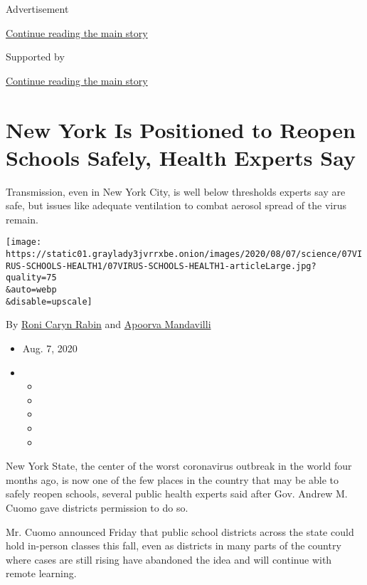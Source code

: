 Advertisement

\protect\hyperlink{after-top}{Continue reading the main story}

Supported by

\protect\hyperlink{after-sponsor}{Continue reading the main story}

\hypertarget{new-york-is-positioned-to-reopen-schools-safely-health-experts-say}{%
\section{New York Is Positioned to Reopen Schools Safely, Health Experts
Say}\label{new-york-is-positioned-to-reopen-schools-safely-health-experts-say}}

Transmission, even in New York City, is well below thresholds experts
say are safe, but issues like adequate ventilation to combat aerosol
spread of the virus remain.

\texttt{[image: https://static01.graylady3jvrrxbe.onion/images/2020/08/07/science/07VIRUS-SCHOOLS-HEALTH1/07VIRUS-SCHOOLS-HEALTH1-articleLarge.jpg?quality=75\\\&auto=webp\\\&disable=upscale]}

By \href{https://www.nytimes3xbfgragh.onion/by/roni-caryn-rabin}{Roni
Caryn Rabin} and
\href{https://www.nytimes3xbfgragh.onion/by/apoorva-mandavilli}{Apoorva
Mandavilli}

\begin{itemize}
\item
  Aug. 7, 2020
\item
  \begin{itemize}
  \item
  \item
  \item
  \item
  \item
  \end{itemize}
\end{itemize}

New York State, the center of the worst coronavirus outbreak in the
world four months ago, is now one of the few places in the country that
may be able to safely reopen schools, several public health experts said
after Gov. Andrew M. Cuomo gave districts permission to do so.

Mr. Cuomo announced Friday that public school districts across the state
could hold in-person classes this fall, even as districts in many parts
of the country where cases are still rising have abandoned the idea and
will continue with remote learning.

